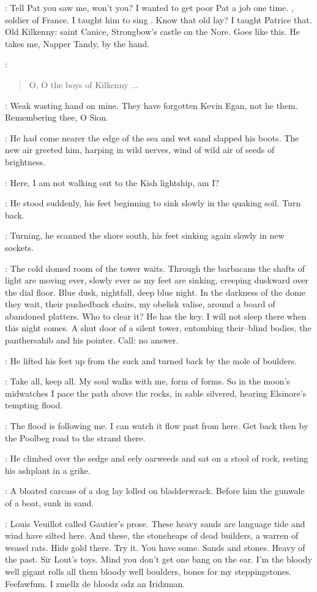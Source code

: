 \mrsegan:
Tell Pat you saw me, won't you?
I wanted to get poor Pat a job one time.
, soldier of France.
I taught him to sing
.
Know that old lay?
I taught Patrice that.
Old Kilkenny:
saint Canice, Strongbow's castle on the Nore.
Goes like this.
He takes me, Napper Tandy, by the hand.

\mrsegan:
\begin{verse}
    O, O the boys of Kilkenny ...
\end{verse}

\StephenInt:
Weak wasting hand on mine.
They have forgotten Kevin Egan,
not he them.
Remembering thee, O Sion.

:
He had come nearer the edge of the sea and wet sand slapped his boots.
The new air greeted him, harping in wild nerves,
wind of wild air
of seeds of brightness.

\StephenInt:
Here,
I am not walking out to the Kish lightship,
am I?

:
He stood suddenly,
his feet beginning to sink slowly in the quaking soil.
Turn back.

:
Turning, he scanned the shore south,
his feet sinking again slowly in new sockets.

\StephenInt:
The cold domed room of the tower waits.
Through the barbacans
the shafts of light are moving ever,
slowly ever as my feet are sinking,
creeping duskward over the dial floor.
Blue dusk, nightfall, deep blue night.
In the darkness of the dome
they wait, their pushedback chairs,
my obelisk valise,
around a board of abandoned platters.
Who to clear it?
He has the key.
I will not sleep there when this night comes.
A shut door of a silent tower,
entombing their--blind bodies,
the panthersahib and his pointer.
Call:
no answer.

:
He lifted his feet up from the suck
and turned back by the mole of boulders.

\StephenInt:
Take all, keep all.
My soul walks with me, form of forms.
So in the moon's midwatches
I pace the path above the rocks,
in sable silvered, hearing Elsinore's tempting flood.

\StephenInt:
The flood is following me.
I can watch it flow past from here.
Get back then by the Poolbeg road to the strand there.

:
He climbed over the sedge and eely oarweeds
and sat on a stool of rock, resting his ashplant in a grike.

:
A bloated carcass of a dog lay lolled on bladderwrack.
Before him the gunwale of a boat, sunk in sand.

\StephenInt:
 Louis Veuillot called Gautier's prose.
These heavy sands are language tide and wind have silted here.
And these, the stoneheaps of dead builders, a warren of weasel rats.
Hide gold there.
Try it.
You have some.
Sands and stones.
Heavy of the past.
Sir Lout's toys.
Mind you don't get one bang on the ear.
I'm the bloody well gigant
rolls all them bloody well boulders,
bones for my steppingstones.
Feefawfum.
I zmellz de bloodz odz an Iridzman.
